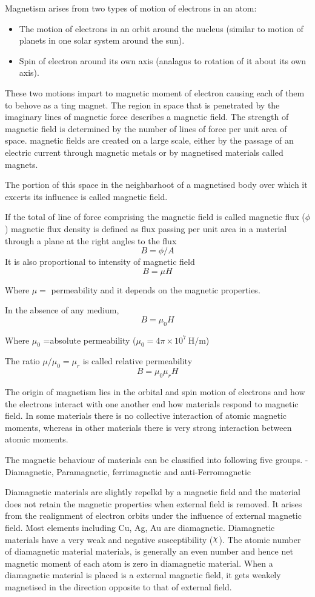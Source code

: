 \documentclass[12pt, a4paper]{article}
\begin{document}
Magnetism arises from two types of motion of electrons in an atom:
\begin{itemize}
	\item The motion of electrons in an orbit around the nucleus (similar to motion of planets in one solar system around the sun).
	\item Spin of electron around its own axis (analagus to rotation of it about its own axis).
\end{itemize}
\doparindent
These two motions impart to magnetic moment of electron causing each of them to behove as a ting magnet. The region in space that is penetrated by the imaginary lines of magnetic force describes a magnetic field. The strength of magnetic field is determined by the number of lines of force per unit area of space. magnetic fields are created on a large scale, either by the passage of an electric current through magnetic metals or by magnetised materials called magnets.

The portion of this space in the neighbarhoot of a magnetised body over which it excerts its influence is called magnetic field.

If the total of line of force comprising the magnetic field is called magnetic flux ($\phi$) magnetic flux density is defined as flux passing per unit area in a material through a plane at the right angles to the flux
$$B=\phi/A$$
\noparindent
It is also proportional to intensity of magnetic field
$$
	B=\mu H$$

Where $\mu=$ permeability and it depends on the magnetic properties.

In the absence of any medium,
$$B=\mu_0 H$$

Where $\mu_0$ =absolute permeability ($\mu_0 = 4\pi\times10^7\ \mathrm{H/m}$)

The ratio $\mu/\mu_0=\mu_r$ is called relative permeability
$$
	B=\mu_0 \mu_r H
$$

The origin of magnetism lies in the orbital and spin motion of electrons and how the electrons interact with one another end how materials respond to magnetic field. In some materials there is no collective interaction of atomic magnetic moments, whereas in other materials there is very strong interaction between atomic moments.

The magnetic behaviour of materials can be classified into following five groups.
- Diamagnetic, Paramagnetic, ferrimagnetic and anti-Ferromagnetic

Diamagnetic materials are slightly repelkd by a magnetic field and the material does not retain the magnetic properties when external field is removed. It arises from the realignment of electron orbits under the influence of external magnetic field. Most elements including Cu, Ag, Au are diamagnetic. Diamagnetic materials have a very weak and negative susceptibility ($\rchi$).
The atomic number of diamagnetic material materials, is generally an even number and hence net magnetic moment of each atom is zero in diamagnetic material. When a diamagnetic material is placed is a external magnetic field, it gets weakely magnetised in the direction opposite to that of external field.
\end{document}
